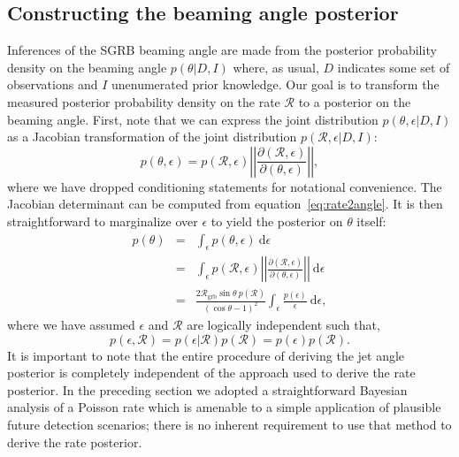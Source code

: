 \documentclass[twocolumn,nofootinbib]{revtex4-1}
\newcommand{\grbrate}{{{\mathcal R}_{\mathrm{grb}}}}
\newcommand{\cbcrate}{{{\mathcal R}}}
\newcommand{\diff}{{\mathrm d}}
\begin{document}
\subsection{Constructing the beaming angle posterior}
Inferences of the \ac{SGRB} beaming angle are made from the posterior
probability density on the beaming angle $p(\theta|D,I)$ where, as
usual, $D$ indicates some set of observations and $I$ unenumerated
prior knowledge.  Our goal is to transform the measured posterior
probability density on the rate $\cbcrate$ to a posterior on the
beaming angle.
%
First, note that we can express the joint distribution
$p(\theta, \epsilon|D,I)$ as a Jacobian transformation of the joint
distribution $p(\cbcrate, \epsilon|D,I)$:
\begin{equation}
p(\theta,\epsilon) = p(\cbcrate,\epsilon)
\left\lvert\left\lvert
\frac{\partial(\cbcrate,\epsilon)}{\partial(\theta,\epsilon)}
\right\rvert\right\rvert,
\end{equation}
%
where we have dropped conditioning statements for notational convenience.
The Jacobian determinant can be  computed from equation~\ref{eq:rate2angle}.
It is then straightforward to marginalize over $\epsilon$ to yield the posterior on $\theta$ itself:
%
\begin{eqnarray}
    \label{eq:beam_posterior}
    p(\theta) & = & \int_{\epsilon} p(\theta,\epsilon)~\diff \epsilon\\
              & = & \int_{\epsilon} p(\cbcrate,\epsilon)
    \left\lvert\left\lvert
    \frac{\partial(\cbcrate,\epsilon)}{\partial(\theta,\epsilon)}
    \right\rvert\right\rvert~\diff \epsilon \\
              & = & \frac{2\grbrate \sin
\theta~p(\cbcrate)}{(\cos\theta-1)^2}\int_{\epsilon}
\frac{p(\epsilon)}{\epsilon} ~\diff \epsilon,
\end{eqnarray}
%
where we have assumed $\epsilon$ and $\cbcrate$ are logically independent such that,
\begin{equation}
p(\epsilon,\cbcrate) = p(\epsilon|\cbcrate)p(\cbcrate) = p(\epsilon)p(\cbcrate).
\end{equation}
%
It is important to note that the entire procedure of deriving the jet
angle posterior is completely independent of the approach used to
derive the rate posterior.  In the preceding section we adopted a
straightforward Bayesian analysis of a Poisson rate which is amenable
to a simple application of plausible future detection scenarios; there
is no inherent requirement to use that method to derive the rate
posterior.
\end{document}
